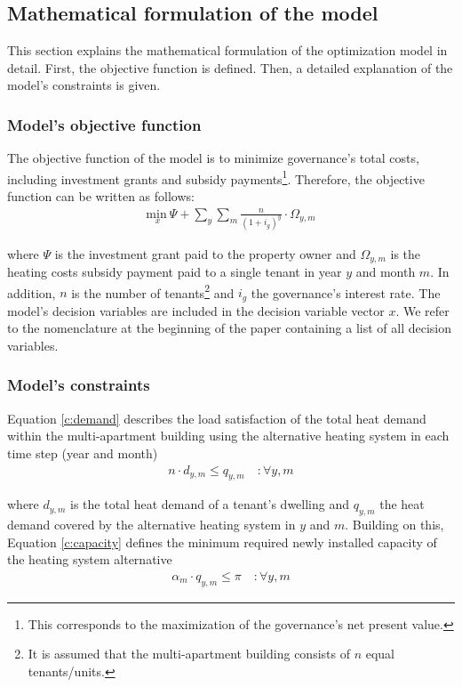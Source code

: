 \subsection{Mathematical formulation of the model}\label{met:formulas}
This section explains the mathematical formulation of the optimization model in detail. First, the objective function is defined. Then, a detailed explanation of the model's constraints is given. 

\subsubsection{Model's objective function}
The objective function of the model is to minimize governance's total costs, including investment grants and subsidy payments\footnote{This corresponds to the maximization of the governance's net present value.}. Therefore, the objective function can be written as follows: 
\begin{align}\label{objective}
\underset{x}{\mathrm{min~}} \Psi + \sum_{y} \sum_{m} \frac{n}{(1+i_g)^y} \cdot \Omega_{y,m}
\end{align}

where $\Psi$ is the investment grant paid to the property owner and $\Omega_{y,m}$ is the heating costs subsidy payment paid to a single tenant in year $y$ and month $m$. In addition, $n$ is the number of tenants\footnote{It is assumed that the multi-apartment building consists of $n$ equal tenants/units.} and $i_g$ the governance's interest rate. The model's decision variables are included in the decision variable vector $x$. We refer to the nomenclature at the beginning of the paper containing a list of all decision variables.

\subsubsection{Model's constraints}
Equation \ref{c:demand} describes the load satisfaction of the total heat demand within the multi-apartment building using the alternative heating system in each time step (year and month) 
\begin{align}\label{c:demand}
n \cdot d_{y,m} \leq q_{y,m} \quad :\forall y,m
\end{align}

where $d_{y,m}$ is the total heat demand of a tenant's dwelling and $q_{y,m}$ the heat demand covered by the alternative heating system in $y$ and $m$. Building on this, Equation \ref{c:capacity} defines the minimum required newly installed capacity of the heating system alternative
\begin{align}\label{c:capacity}
\alpha_{m} \cdot q_{y,m} \leq \pi \quad :\forall y,m
\end{align}


